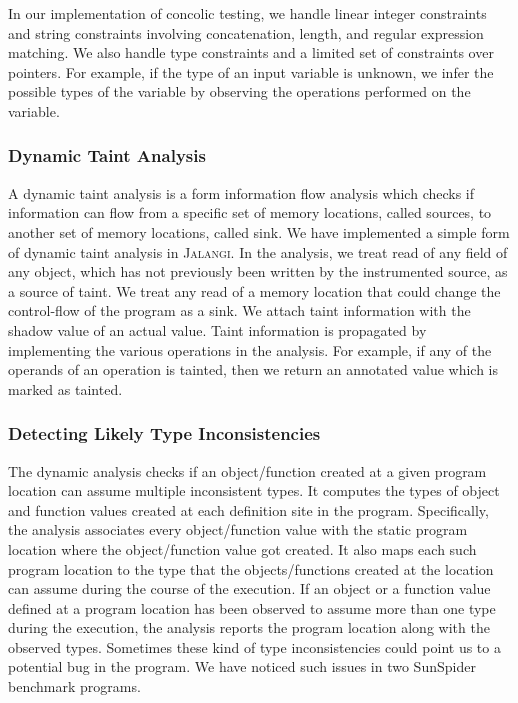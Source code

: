 \documentclass{sig-alternate}
\def\jalangi{\textsc{Jalangi}}
\begin{document}
In our implementation of concolic testing, we handle linear integer
constraints and string constraints involving concatenation, length,
and regular expression matching.  We also handle type constraints and
a limited set of constraints over pointers.  For example, if the type
of an input variable is unknown, we infer the possible types of the
variable by observing the operations performed on the variable.

\subsubsection*{Dynamic Taint Analysis}
\label{sec:taint-analysis}

A dynamic taint analysis is a form information flow analysis which
checks if information can flow from a specific set of memory
locations, called sources, to another set of memory locations, called
sink.  We have implemented a simple form of dynamic taint analysis in
\jalangi{}.  In the analysis, we treat read of any field of any
object, which has not previously been written by the instrumented
source, as a source of taint.  We treat any read of a memory location
that could change the control-flow of the program as a sink.  We
attach taint information with the shadow value of an actual value.
Taint information is propagated by implementing the various operations
in the analysis.  For example, if any of the operands of an operation
is tainted, then we return an annotated value which is marked as
tainted.

\subsubsection*{Detecting Likely Type Inconsistencies}
\label{sec:detect-likely-type}

The dynamic analysis checks if an object/function created at a given
program location can assume multiple inconsistent types.  It computes
the types of object and function values created at each definition
site in the program.  Specifically, the analysis associates every
object/function value with the static program location where the
object/function value got created.  It also maps each such program
location to the type that the objects/functions created at the
location can assume during the course of the execution.  If an object
or a function value defined at a program location has been observed to
assume more than one type during the execution, the analysis reports
the program location along with the observed types.  Sometimes these
kind of type inconsistencies could point us to a potential bug in the
program.  We have noticed such issues in two SunSpider benchmark
programs.
\end{document}
